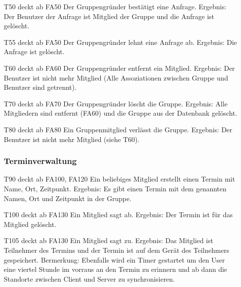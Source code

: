 \documentclass{scrartcl}
\begin{document}
\begin{itemize}
	\item[T50] deckt ab FA50  \newline
	Der Gruppengründer bestätigt eine Anfrage. \newline
	Ergebnis: Der Benutzer der Anfrage ist Mitglied der Gruppe und die Anfrage ist gelöscht.
	
	\item[T55] deckt ab FA50  \newline
	Der Gruppengründer lehnt eine Anfrage ab. \newline
	Ergebnis: Die Anfrage ist gelöscht.
	
	\item[T60] deckt ab FA60  \newline
	Der Gruppengründer entfernt ein Mitglied.  \newline
	Ergebnis: Der Benutzer ist nicht mehr Mitglied (Alle Assoziationen zwischen Gruppe und Benutzer sind getrennt).
	
	\item[T70] deckt ab FA70  \newline
	Der Gruppengründer löscht die Gruppe.  \newline
	Ergebnis: Alle Mitgliedern sind entfernt (FA60) und die Gruppe aus der Datenbank gelöscht.
	
	\item[T80] deckt ab FA80  \newline
	Ein Gruppenmitglied verlässt die Gruppe.  \newline
	Ergebnis: Der Benutzer ist nicht mehr Mitglied (siehe T60).
	
	\subsubsection{Terminverwaltung}
	
	\item[T90] deckt ab FA100, FA120  \newline
	Ein beliebiges Mitglied erstellt einen Termin mit Name, Ort, Zeitpunkt.  \newline
	Ergebnis: Es gibt einen Termin mit dem genannten Namen, Ort und Zeitpunkt in der Gruppe.
	
	\item [T100] deckt ab FA130 \newline
	Ein Mitglied sagt ab.  \newline
	Ergebnis: Der Termin ist für das Mitglied gelöscht.
	
	\item[T105] deckt ab FA130  \newline
	Ein Mitglied sagt zu.  \newline
	Ergebnis: Das Mitglied ist Teilnehmer des Termins und der Termin ist auf dem Gerät des Teilnehmers gespeichert. \newline
	Bermerkung: Ebenfalls wird ein Timer gestartet um den User eine viertel Stunde im vorraus an den Termin zu erinnern und ab dann die Standorte zwischen Client und Server zu synchronisieren.
	

\end{itemize}
\end{document}
